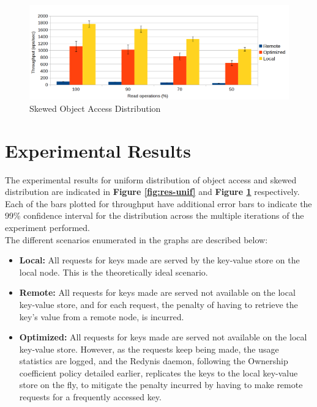\documentclass{sig-alternate}
\begin{document}
\begin{figure}[ht]
\centering
\includegraphics[width=\textwidth]{images/Uniform-dist-throughput.png}
\caption{Skewed Object Access Distribution}
\label{fig:res-skew}
\end{figure}


\section{Experimental Results}

The experimental results for uniform distribution of object access and skewed distribution are indicated in \textbf{Figure \ref{fig:res-unif}} and \textbf{Figure \ref{fig:res-skew}} respectively.\\

Each of the bars plotted for throughput have additional error bars to indicate the 99\% confidence interval for the distribution across the multiple iterations of the experiment performed. \\

The different scenarios enumerated in the graphs are described below:
\begin{itemize}
	\item \textbf{Local:} All requests for keys made are served by the key-value store on the local node. This is the theoretically ideal scenario.
	\item \textbf{Remote:} All requests for keys made are served not available on the local key-value store, and for each request, the penalty of having to retrieve the key's value from a remote node, is incurred.
	\item \textbf{Optimized:} All requests for keys made are served not available on the local key-value store. However, as the requests keep being made, the usage statistics are logged, and the Redynis daemon, following the Ownership coefficient policy detailed earlier, replicates the keys to the local key-value store on the fly, to mitigate the penalty incurred by having to make remote requests for a frequently accessed key.
\end{itemize}
\end{document}
